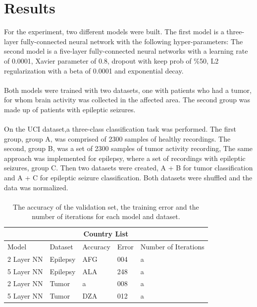 \documentclass{llncs}       %
\begin{document}
\paragraph{}
\section{Results}
\label{sec:4}
 For the experiment, two different models were built.  The first model is a three-layer fully-connected neural network with the following hyper-parameters: 
The second model is a five-layer fully-connected neural networks with a learning rate of 0.0001, Xavier parameter of 0.8, dropout with keep prob of \%50, L2 regularization with a beta of 0.0001 and exponential decay. 
\paragraph{}
Both models were trained with two datasets, one with patients who had a tumor, for whom brain activity was collected in the affected area. The second group was made up of  patients with epileptic seizures.
\paragraph{}
On the UCI dataset,a three-class classification task was performed. The first group, group A, was comprised of  2300 samples of healthy recordings. The second, group B, was a set of 2300 samples of tumor activity recording, The same approach was implemented for epilepsy,  where a set of recordings with epileptic seizures, group  C. Then two datasets were created, A + B for tumor classification and A + C for epileptic seizure classification. Both datasets were shuffled and the data was normalized. 

\paragraph{}

\begin{table}[h!]
\begin{tabular}{ |p{3cm}||p{2cm}|p{2cm}|p{2cm}|p{1.5cm}|  }
 \hline
 \multicolumn{5}{|c|}{Country List} \\
 \hline
 Model     & Dataset &Accuracy&Error& Number of Iterations\\
 \hline
 2 Layer NN & Epilepsy &AFG&   004 &a\\
 5 Layer NN & Epilepsy  & ALA   &248 &a\\
 2 Layer NN & Tumor & a &  008 &a\\
 5 Layer NN & Tumor & DZA&  012 &a\\
 \hline
\end{tabular}
\caption{ The accuracy of the validation set, the training error and the number of iterations for each model and dataset.}
\end{table}
\end{document}

